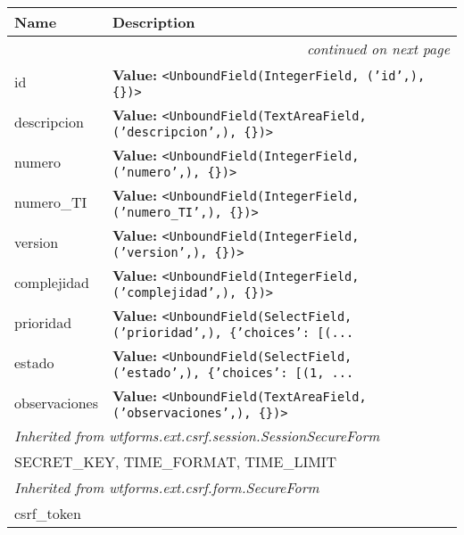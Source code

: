     \vspace{-1cm}
\hspace{\varindent}\begin{longtable}{|p{\varnamewidth}|p{\vardescrwidth}|l}
\cline{1-2}
\cline{1-2} \centering \textbf{Name} & \centering \textbf{Description}& \\
\cline{1-2}
\endhead\cline{1-2}\multicolumn{3}{r}{\small\textit{continued on next page}}\\\endfoot\cline{1-2}
\endlastfoot\raggedright i\-d\- & \raggedright \textbf{Value:} 
{\tt {\textless}UnboundField(IntegerField, ('id',), \{\}){\textgreater}}&\\
\cline{1-2}
\raggedright d\-e\-s\-c\-r\-i\-p\-c\-i\-o\-n\- & \raggedright \textbf{Value:} 
{\tt {\textless}UnboundField(TextAreaField, ('descripcion',), \{\}){\textgreater}}&\\
\cline{1-2}
\raggedright n\-u\-m\-e\-r\-o\- & \raggedright \textbf{Value:} 
{\tt {\textless}UnboundField(IntegerField, ('numero',), \{\}){\textgreater}}&\\
\cline{1-2}
\raggedright n\-u\-m\-e\-r\-o\-\_\-T\-I\- & \raggedright \textbf{Value:} 
{\tt {\textless}UnboundField(IntegerField, ('numero\_TI',), \{\}){\textgreater}}&\\
\cline{1-2}
\raggedright v\-e\-r\-s\-i\-o\-n\- & \raggedright \textbf{Value:} 
{\tt {\textless}UnboundField(IntegerField, ('version',), \{\}){\textgreater}}&\\
\cline{1-2}
\raggedright c\-o\-m\-p\-l\-e\-j\-i\-d\-a\-d\- & \raggedright \textbf{Value:} 
{\tt {\textless}UnboundField(IntegerField, ('complejidad',), \{\}){\textgreater}}&\\
\cline{1-2}
\raggedright p\-r\-i\-o\-r\-i\-d\-a\-d\- & \raggedright \textbf{Value:} 
{\tt {\textless}UnboundField(SelectField, ('prioridad',), \{'choices': [(\texttt{...}}&\\
\cline{1-2}
\raggedright e\-s\-t\-a\-d\-o\- & \raggedright \textbf{Value:} 
{\tt {\textless}UnboundField(SelectField, ('estado',), \{'choices': [(1, \texttt{...}}&\\
\cline{1-2}
\raggedright o\-b\-s\-e\-r\-v\-a\-c\-i\-o\-n\-e\-s\- & \raggedright \textbf{Value:} 
{\tt {\textless}UnboundField(TextAreaField, ('observaciones',), \{\}){\textgreater}}&\\
\cline{1-2}
\multicolumn{2}{|l|}{\textit{Inherited from wtforms.ext.csrf.session.SessionSecureForm}}\\
\multicolumn{2}{|p{\varwidth}|}{\raggedright SECRET\_KEY, TIME\_FORMAT, TIME\_LIMIT}\\
\cline{1-2}
\multicolumn{2}{|l|}{\textit{Inherited from wtforms.ext.csrf.form.SecureForm}}\\
\multicolumn{2}{|p{\varwidth}|}{\raggedright csrf\_token}\\
\cline{1-2}
\end{longtable}

